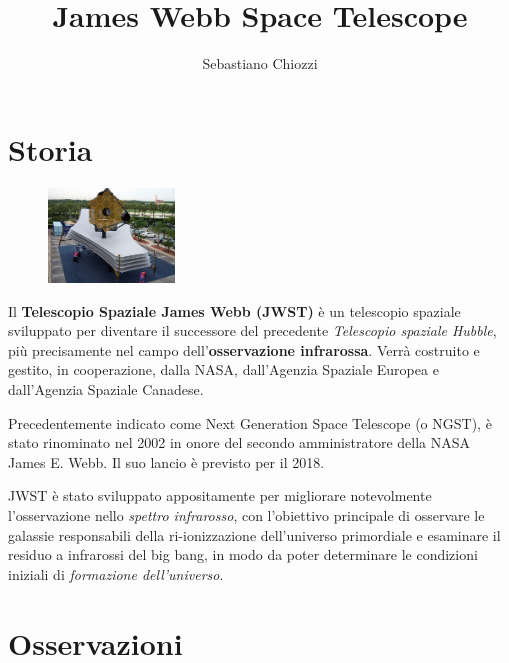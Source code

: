 \documentclass[12pt,a4paper]{article}
\begin{document}
\title{\vspace{-70pt}James Webb Space Telescope}
\author{Sebastiano Chiozzi}
\date{}
\maketitle
\pagestyle{empty}
\thispagestyle{empty}

\section*{Storia}
\label{storia}
\begin{figure}
  \vspace{-10pt}
  \begin{center}
    \includegraphics[width=0.30\textwidth]{satellite}
  \end{center}
  \vspace{-20pt}
\end{figure}
Il \textbf{Telescopio Spaziale James Webb (JWST)} è un telescopio spaziale sviluppato per diventare il successore del precedente \emph{Telescopio spaziale Hubble}, più precisamente nel campo dell'\textbf{osservazione infrarossa}. Verrà costruito e gestito, in cooperazione, dalla NASA, dall'Agenzia Spaziale Europea e dall'Agenzia Spaziale Canadese.

Precedentemente indicato come Next Generation Space Telescope (o NGST), è stato rinominato nel 2002 in onore del secondo amministratore della NASA James E. Webb.
Il suo lancio è previsto per il 2018.

JWST è stato sviluppato appositamente per migliorare notevolmente l'osservazione nello \emph{spettro infrarosso}, con l'obiettivo principale di osservare le galassie responsabili della ri-ionizzazione dell'universo primordiale e esaminare il residuo a infrarossi del big bang, in modo da poter determinare le condizioni iniziali di \emph{formazione dell'universo}.

\section*{Osservazioni}
\label{osservazioni}
\end{document}
